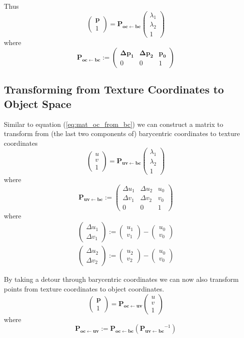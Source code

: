 \documentclass{article}
\newcommand{\point}[1]{\mathbf{#1}}
\newcommand{\mat}[1]{\mathbf{#1}}
\newcommand{\pMat}[2]{\mat{P_{#1 \leftarrow #2}}}
\newcommand{\colvec}[1]{\begin{pmatrix}#1\end{pmatrix}}
\begin{document}
Thus
\[
 \colvec{\point{p}\\1} = \pMat{oc}{bc} \colvec{\lambda_1 \\ \lambda_2 \\ 1}
\]
where
\begin{equation}
\label{eq:mat_oc_from_bc}
 \pMat{oc}{bc} := \begin{pmatrix} 
                  \point{\Delta p_1} & \point{\Delta p_2} & \point{p_0} \\
                  0 & 0 & 1
                 \end{pmatrix}
\end{equation}


\subsection{Transforming from Texture Coordinates to Object Space}

Similar to equation (\ref{eq:mat_oc_from_bc}) we can construct a matrix to transform from (the last two components of) barycentric coordinates to texture coordinates
\[
 \colvec{u \\ v \\1} = \pMat{uv}{bc} \colvec{\lambda_1 \\ \lambda_2 \\ 1}
\]
where
\begin{equation}
 \pMat{uv}{bc} := \begin{pmatrix} 
                  \Delta u_1 & \Delta u_2 & u_0 \\
                  \Delta v_1 & \Delta v_2 & v_0 \\
                  0 & 0 & 1
                 \end{pmatrix}
\end{equation}
where
\begin{align*}
 \colvec{\Delta u_1 \\ \Delta v_1} := \colvec{u_1 \\ v_1} - \colvec{u_0 \\ v_0}\\
 \colvec{\Delta u_2 \\ \Delta v_2} := \colvec{u_2 \\ v_2} - \colvec{u_0 \\ v_0}
\end{align*}

By taking a detour through barycentric coordinates we can now also transform points from texture coordinates to object coordinates.
\begin{equation*}
\colvec{\point{p}\\1} = \pMat{oc}{uv} \colvec{u \\ v \\1} 
\end{equation*}
where
\begin{equation*}
 \pMat{oc}{uv} := \pMat{oc}{bc}(\pMat{uv}{bc}^{-1}) 
\end{equation*}
\end{document}
